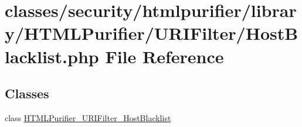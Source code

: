 \hypertarget{HostBlacklist_8php}{\section{classes/security/htmlpurifier/library/\+H\+T\+M\+L\+Purifier/\+U\+R\+I\+Filter/\+Host\+Blacklist.php File Reference}
\label{HostBlacklist_8php}
}
\subsection*{Classes}
\begin{DoxyCompactItemize}
\item 
class \hyperlink{classHTMLPurifier__URIFilter__HostBlacklist}{H\+T\+M\+L\+Purifier\+\_\+\+U\+R\+I\+Filter\+\_\+\+Host\+Blacklist}
\end{DoxyCompactItemize}
